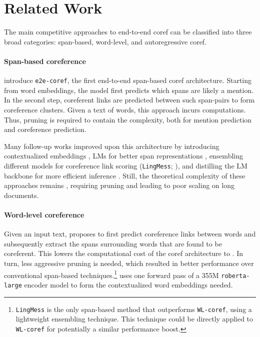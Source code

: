 \documentclass[11pt]{article}
\newcommand\wlcoref{{\texttt{WL-coref}}}
\begin{document}
\section{Related Work}
The main competitive approaches to end-to-end coref can be classified into three broad categories: span-based, word-level, and autoregressive coref. 



\paragraph{Span-based coreference} \citet{lee-etal-2017-end} introduce \texttt{e2e-coref}, the first end-to-end span-based coref architecture. Starting from word embeddings, the model first predicts which spans are likely a mention. In the second step, coreferent links are predicted between such span-pairs to form coreference clusters. Given a text of  words, this approach incurs  computations. Thus, pruning is required to contain the complexity, both for mention prediction and coreference prediction. 

Many follow-up works improved upon this architecture by introducing contextualized embeddings \citep{lee-etal-2018-higher, kantor-globerson-2019-coreference}, LMs for better span representations \citep{joshi-etal-2020-spanbert}, 
ensembling different models for coreference link scoring (\texttt{LingMess}; \citealp{otmazgin2023lingmess}), and distilling the LM backbone for more efficient inference \citep{otmazgin-etal-2022-f}. Still, the theoretical complexity of these approaches remains , requiring pruning and leading to poor scaling on long documents.

\paragraph{Word-level coreference} Given an input text, \citet{dobrovolskii-2021-word} proposes to first predict coreference links between words and subsequently extract the spans surrounding words that are found to be coreferent. This lowers the computational cost of the coref architecture to . In turn, less aggressive pruning is needed, which resulted in better performance over conventional span-based techniques.\footnote{\texttt{LingMess} \citep{otmazgin2023lingmess} is the only span-based method that outperforms \wlcoref{}, using a lightweight ensembling technique. This technique could be directly applied to \wlcoref{} for potentially a similar performance boost.} \citet{dobrovolskii-2021-word} uses one forward pass of a 355M \texttt{roberta-large} encoder model to form the contextualized word embeddings needed.
\end{document}
